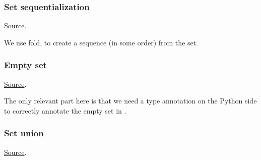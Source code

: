 \subsubsection{Set sequentialization}
\href{https://github.com/saltiniroberto/ssf/blob/7ea6e18093d9da3154b4e396dd435549f687e6b9/high_level/common/pythonic_code_generic.py#L23-L24}{Source}.



\begin{mathpar}
\end{mathpar}
We use fold, to create a sequence (in some order) from the set.

\subsubsection{ Empty set}
\href{https://github.com/saltiniroberto/ssf/blob/7ea6e18093d9da3154b4e396dd435549f687e6b9/high_level/common/pythonic_code_generic.py#L27-L28}{Source}.



\begin{mathpar}
\end{mathpar}
The only relevant part here is that we need a type annotation on the Python side to correctly annotate the empty set in \tlap{}.

\subsubsection{ Set union}
\href{https://github.com/saltiniroberto/ssf/blob/7ea6e18093d9da3154b4e396dd435549f687e6b9/high_level/common/pythonic_code_generic.py#L31-L32}{Source}.



